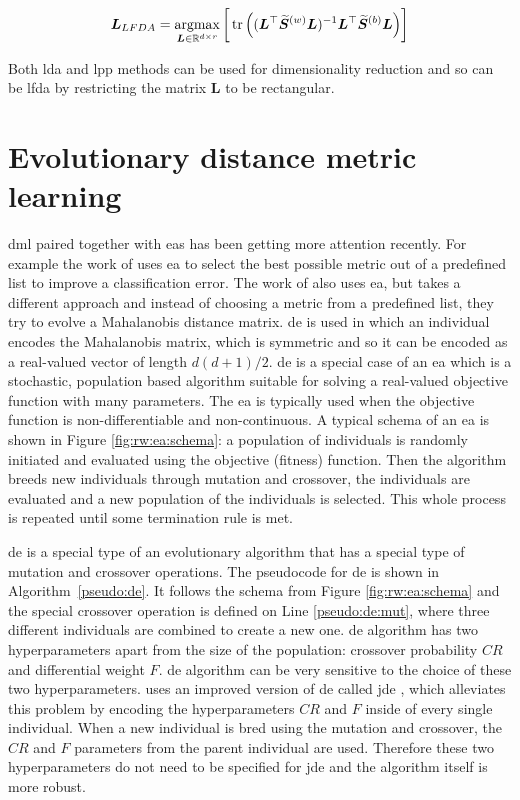 \documentclass[12pt,a4paper]{report}
\begin{document}
\begin{equation}
\bm{L}_{LFDA} = \operatorname*{argmax}_{\bm{L} \in \mathbb{R}^{d \times r}} \bigg[\operatorname*{tr}\Big( ( \bm{L}^\top\widetilde{\bm{S}}^{(w)}\bm{L} )^{-1} \bm{L}^\top\widetilde{\bm{S}}^{(b)}\bm{L} \Big)\bigg] \label{eq:rw:lfda:objective}
\end{equation}

Both \ac{lda} and \ac{lpp} methods can be used for dimensionality reduction and so can be \ac{lfda} by restricting the matrix $\bm{L}$ to be rectangular.

\section{Evolutionary distance metric learning} \label{chap:rw:fukui}


\Acl{dml} paired together with \acp{ea} has been getting more attention recently. For example the work of \citep{koloseni2012optimized} uses \ac{ea} to select the best possible metric out of a predefined list to improve a classification error. The work of \citep{fukui2013evolutionary} also uses \ac{ea}, but takes a different approach and instead of choosing a metric from a predefined list, they try to evolve a Mahalanobis distance matrix. \Acl{de} is used in which an individual encodes the Mahalanobis matrix, which is symmetric and so it can be encoded as a real-valued vector of length $d(d+1)/2$. \Acl{de} is a special case of an \ac{ea} which is a stochastic, population based algorithm suitable for solving a real-valued objective function with many parameters. The \ac{ea} is typically used when the objective function is non-differentiable and non-continuous. A typical schema of an \ac{ea} is shown in Figure \ref{fig:rw:ea:schema}: a population of individuals is randomly initiated and evaluated using the objective (fitness) function. Then the algorithm breeds new individuals through mutation and crossover, the individuals are evaluated and a new population of the individuals is selected. This whole process is repeated until some termination rule is met.

\Ac{de} is a special type of an evolutionary algorithm that has a special type of mutation and crossover operations. The pseudocode for \ac{de} is shown in Algorithm~\ref{pseudo:de}. It follows the schema from Figure \ref{fig:rw:ea:schema} and the special crossover operation is defined on Line \ref{pseudo:de:mut}, where three different individuals are combined to create a new one. \ac{de} algorithm has two hyperparameters apart from the size of the population: crossover probability $CR$ and differential weight $F$. \ac{de} algorithm can be very sensitive to the choice of these two hyperparameters. \citep{fukui2013evolutionary} uses an improved version of \ac{de} called \acf{jde} \citep{brest2006self}, which alleviates this problem by encoding the hyperparameters $CR$ and $F$ inside of every single individual. When a new individual is bred using the mutation and crossover, the $CR$ and $F$ parameters from the parent individual are used. Therefore these two hyperparameters do not need to be specified for \ac{jde} and the algorithm itself is more robust.
\end{document}
